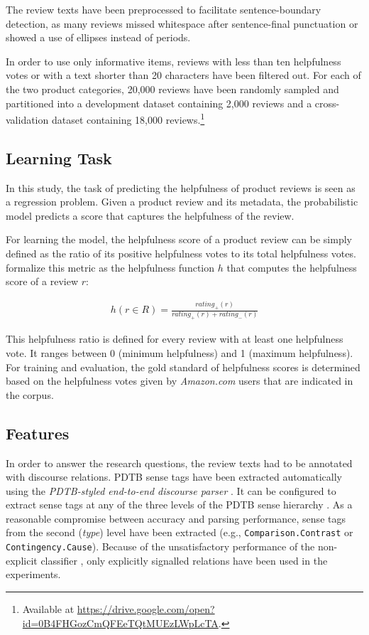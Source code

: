 \documentclass[
    a4paper,%
    12pt,%
    oneside,%
    toc=bibliography,
    final,
]{scrartcl}
\begin{document}
The review texts have been preprocessed to facilitate sentence-boundary detection, as many reviews missed whitespace after sentence-final punctuation or showed a use of ellipses instead of periods.

In order to use only informative items, reviews with less than ten helpfulness votes or with a text shorter than 20 characters have been filtered out. For each of the two product categories, 20,000 reviews have been randomly sampled and partitioned into a development dataset containing 2,000 reviews and a cross-validation dataset containing 18,000 reviews.\footnote{Available at \url{https://drive.google.com/open?id=0B4FHGozCmQFEeTQtMUEzLWpLcTA}.}

\subsection{Learning Task}

In this study, the task of predicting the helpfulness of product reviews is seen as a regression problem. Given a product review and its metadata, the probabilistic model predicts a score that captures the helpfulness of the review.

For learning the model, the helpfulness score of a product review can be simply defined as the ratio of its positive helpfulness votes to its total helpfulness votes. \citet[424]{Kim2006} formalize this metric as the helpfulness function $ h $ that computes the helpfulness score of a review $ r $:

\vspace{-2em}

\begin{align}
\label{helpfulness-fuction}
h(r \in R) = \frac{rating_+(r)}{rating_+(r) + rating_-(r)}
\end{align}

This helpfulness ratio is defined for every review with at least one helpfulness vote. It ranges between 0 (minimum helpfulness) and 1 (maximum helpfulness). For training and evaluation, the gold standard of helpfulness scores is determined based on the helpfulness votes given by \textit{Amazon.com} users that are indicated in the corpus.

\subsection{Features}

In order to answer the research questions, the review texts had to be annotated with discourse relations. PDTB sense tags have been extracted automatically using the \textit{PDTB-styled end-to-end discourse parser} \citep{Lin2014}. It can be configured to extract sense tags at any of the three levels of the PDTB sense hierarchy \citep[cf.][5]{Prasad2008}. As a reasonable compromise between accuracy and parsing performance, sense tags from the second (\textit{type}) level have been extracted (e.g., \lstinline|Comparison.Contrast| or \lstinline|Contingency.Cause|). Because of the unsatisfactory performance of the non-explicit classifier \citep[cf.][175]{Lin2014}, only explicitly signalled relations have been used in the experiments.
\end{document}
